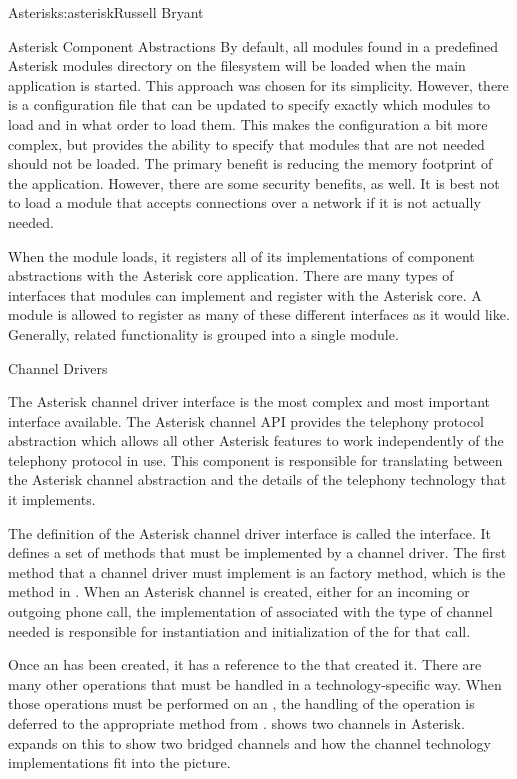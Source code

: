 \begin{aosachapter}{Asterisk}{s:asterisk}{Russell Bryant}
\begin{aosasect1}{Asterisk Component Abstractions}
By default, all modules found in a predefined Asterisk modules
directory on the filesystem will be loaded when the main application
is started. This approach was chosen for its simplicity. However,
there is a configuration file that can be updated to specify exactly
which modules to load and in what order to load them. This makes the
configuration a bit more complex, but provides the ability to specify
that modules that are not needed should not be loaded. The primary
benefit is reducing the memory footprint of the application. However,
there are some security benefits, as well. It is best not to load a
module that accepts connections over a network if it is not actually
needed.

When the module loads, it registers all of its implementations of
component abstractions with the Asterisk core application. There are
many types of interfaces that modules can implement and register with
the Asterisk core. A module is allowed to register as many of these
different interfaces as it would like. Generally, related
functionality is grouped into a single module.

\begin{aosasect2}{Channel Drivers}
\label{sec.asterisk.drivers}

The Asterisk channel driver interface is the most complex and most
important interface available. The Asterisk channel API provides the
telephony protocol abstraction which allows all other Asterisk
features to work independently of the telephony protocol in use. This
component is responsible for translating between the Asterisk channel
abstraction and the details of the telephony technology that it
implements.

The definition of the Asterisk channel driver interface is called the
 interface. It defines a set of methods that
must be implemented by a channel driver. The first method that a
channel driver must implement is an  factory
method, which is the  method in
. When an Asterisk channel is created, either
for an incoming or outgoing phone call, the implementation of
 associated with the type of channel needed
is responsible for instantiation and initialization of the
 for that call.

Once an  has been created, it has a reference to
the  that created it.  There are many other
operations that must be handled in a technology-specific way. When
those operations must be performed on an , the
handling of the operation is deferred to the appropriate method from
.  shows
two channels in Asterisk. 
expands on this to show two bridged channels and how the channel
technology implementations fit into the picture.


\end{aosasect2}
\end{aosasect1}
\end{aosachapter}
